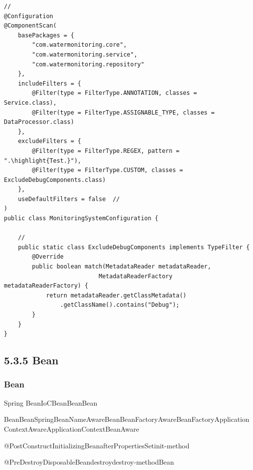 \begin{lstlisting}[style=java]
// 
@Configuration
@ComponentScan(
    basePackages = {
        "com.watermonitoring.core",
        "com.watermonitoring.service",
        "com.watermonitoring.repository"
    },
    includeFilters = {
        @Filter(type = FilterType.ANNOTATION, classes = Service.class),
        @Filter(type = FilterType.ASSIGNABLE_TYPE, classes = DataProcessor.class)
    },
    excludeFilters = {
        @Filter(type = FilterType.REGEX, pattern = ".\highlight{Test.}"),
        @Filter(type = FilterType.CUSTOM, classes = ExcludeDebugComponents.class)
    },
    useDefaultFilters = false  // 
)
public class MonitoringSystemConfiguration {
    
    // 
    public static class ExcludeDebugComponents implements TypeFilter {
        @Override
        public boolean match(MetadataReader metadataReader, 
                           MetadataReaderFactory metadataReaderFactory) {
            return metadataReader.getClassMetadata()
                .getClassName().contains("Debug");
        }
    }
}
\end{lstlisting}

\hypertarget{bean-2}{%
\subsection{5.3.5 Bean}\label{bean-2}}

\hypertarget{bean-3}{%
\subsubsection{Bean}\label{bean-3}}

Spring BeanIoCBeanBean\important{}\important{}Bean

BeanBeanSpringBeanNameAwareBeanBeanFactoryAwareBeanFactoryApplicationContextAwareApplicationContextBeanAware

\important{}@PostConstructInitializingBeanafterPropertiesSetinit-method

\important{}@PreDestroyDisposableBeandestroydestroy-methodBean

